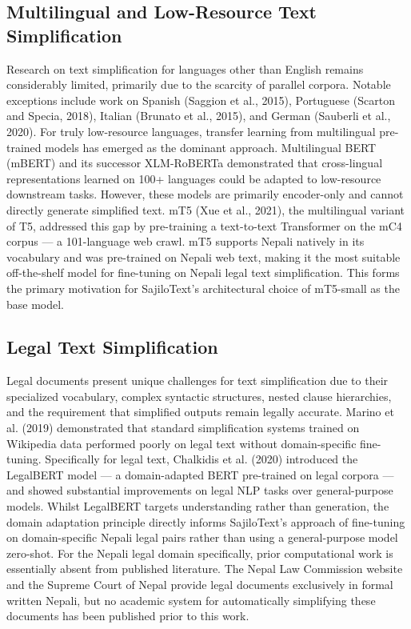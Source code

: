 \documentclass[12pt]{report}
\begin{document}
\subsection{Multilingual and Low-Resource Text Simplification}
Research on text simplification for languages other than English remains considerably limited, primarily due to the scarcity of parallel corpora. Notable exceptions include work on Spanish (Saggion et al., 2015), Portuguese (Scarton and Specia, 2018), Italian (Brunato et al., 2015), and German (Sauberli et al., 2020).
For truly low-resource languages, transfer learning from multilingual pre-trained models has emerged as the dominant approach. Multilingual BERT (mBERT) and its successor XLM-RoBERTa demonstrated that cross-lingual representations learned on 100+ languages could be adapted to low-resource downstream tasks. However, these models are primarily encoder-only and cannot directly generate simplified text.
mT5 (Xue et al., 2021), the multilingual variant of T5, addressed this gap by pre-training a text-to-text Transformer on the mC4 corpus — a 101-language web crawl. mT5 supports Nepali natively in its vocabulary and was pre-trained on Nepali web text, making it the most suitable off-the-shelf model for fine-tuning on Nepali legal text simplification. This forms the primary motivation for SajiloText's architectural choice of mT5-small as the base model.
\subsection{Legal Text Simplification}
Legal documents present unique challenges for text simplification due to their specialized vocabulary, complex syntactic structures, nested clause hierarchies, and the requirement that simplified outputs remain legally accurate. Marino et al. (2019) demonstrated that standard simplification systems trained on Wikipedia data performed poorly on legal text without domain-specific fine-tuning.
Specifically for legal text, Chalkidis et al. (2020) introduced the LegalBERT model — a domain-adapted BERT pre-trained on legal corpora — and showed substantial improvements on legal NLP tasks over general-purpose models. Whilst LegalBERT targets understanding rather than generation, the domain adaptation principle directly informs SajiloText's approach of fine-tuning on domain-specific Nepali legal pairs rather than using a general-purpose model zero-shot.
For the Nepali legal domain specifically, prior computational work is essentially absent from published literature. The Nepal Law Commission website and the Supreme Court of Nepal provide legal documents exclusively in formal written Nepali, but no academic system for automatically simplifying these documents has been published prior to this work.
\end{document}
